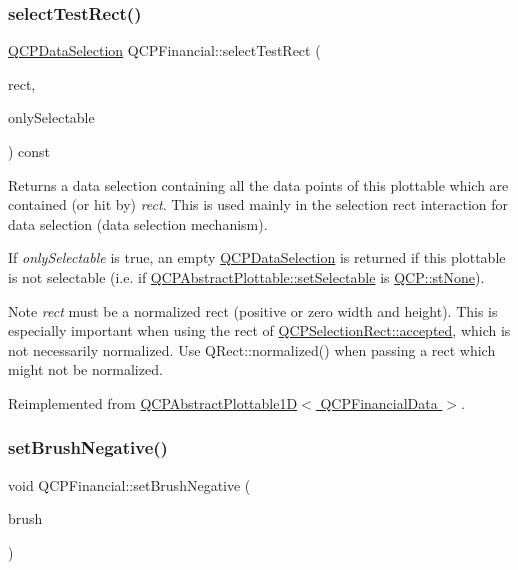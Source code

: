 \subsubsection{\texorpdfstring{select\+Test\+Rect()}{selectTestRect()}}
{\footnotesize\ttfamily \hyperlink{classQCPDataSelection}{Q\+C\+P\+Data\+Selection} Q\+C\+P\+Financial\+::select\+Test\+Rect (\begin{DoxyParamCaption}\item[{const Q\+RectF \&}]{rect,  }\item[{bool}]{only\+Selectable }\end{DoxyParamCaption}) const\hspace{0.3cm}{\ttfamily [virtual]}}





Returns a data selection containing all the data points of this plottable which are contained (or hit by) {\itshape rect}. This is used mainly in the selection rect interaction for data selection (data selection mechanism).

If {\itshape only\+Selectable} is true, an empty \hyperlink{classQCPDataSelection}{Q\+C\+P\+Data\+Selection} is returned if this plottable is not selectable (i.\+e. if \hyperlink{classQCPAbstractPlottable_ac238d6e910f976f1f30d41c2bca44ac3}{Q\+C\+P\+Abstract\+Plottable\+::set\+Selectable} is \hyperlink{namespaceQCP_ac6cb9db26a564b27feda362a438db038aa64628e338a2dd1e6f0dc84dec0b63fe}{Q\+C\+P\+::st\+None}).

\begin{DoxyNote}{Note}
{\itshape rect} must be a normalized rect (positive or zero width and height). This is especially important when using the rect of \hyperlink{classQCPSelectionRect_a15a43542e1f7b953a44c260b419e6d2c}{Q\+C\+P\+Selection\+Rect\+::accepted}, which is not necessarily normalized. Use {\ttfamily Q\+Rect\+::normalized()} when passing a rect which might not be normalized. 
\end{DoxyNote}


Reimplemented from \hyperlink{classQCPAbstractPlottable1D_a22377bf6e57ab7eedbc9e489250c6ded}{Q\+C\+P\+Abstract\+Plottable1\+D$<$ Q\+C\+P\+Financial\+Data $>$}.

\mbox{\label{classQCPFinancial_a8bbdd87629f9144b3ef51af660c0961a}} 
\subsubsection{\texorpdfstring{set\+Brush\+Negative()}{setBrushNegative()}}
{\footnotesize\ttfamily void Q\+C\+P\+Financial\+::set\+Brush\+Negative (\begin{DoxyParamCaption}\item[{const Q\+Brush \&}]{brush }\end{DoxyParamCaption})}

